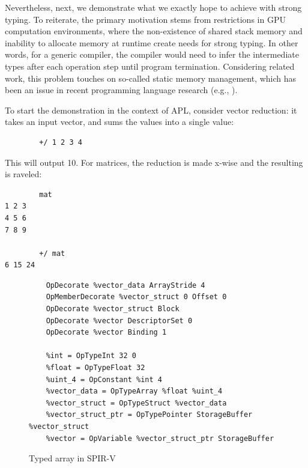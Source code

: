 \documentclass{report}
\begin{document}
Nevertheless, next, we demonstrate what we exactly hope to achieve with strong typing. To reiterate, the primary motivation stems from restrictions in GPU computation environments, where the non-existence of shared stack memory and inability to allocate memory at runtime create needs for strong typing. In other words, for a generic compiler, the compiler would need to infer the intermediate types after each operation step until program termination. Considering related work, this problem touches on so-called static memory management, which has been an issue in recent programming language research (e.g., \cite{proust2017asap}).

To start the demonstration in the context of APL, consider vector reduction: it takes an input vector, and sums the values into a single value:

\begin{verbatim}
        +/ 1 2 3 4
\end{verbatim}

This will output 10. For matrices, the reduction is made x-wise and the resulting is raveled:

\begin{verbatim}
        mat
1 2 3
4 5 6
7 8 9

        +/ mat
6 15 24
\end{verbatim}

\begin{figure}
    \begin{lstlisting}
    OpDecorate %vector_data ArrayStride 4
    OpMemberDecorate %vector_struct 0 Offset 0
    OpDecorate %vector_struct Block
    OpDecorate %vector DescriptorSet 0
    OpDecorate %vector Binding 1

    %int = OpTypeInt 32 0
    %float = OpTypeFloat 32
    %uint_4 = OpConstant %int 4
    %vector_data = OpTypeArray %float %uint_4
    %vector_struct = OpTypeStruct %vector_data
    %vector_struct_ptr = OpTypePointer StorageBuffer %vector_struct
    %vector = OpVariable %vector_struct_ptr StorageBuffer
    \end{lstlisting}
    \caption{Typed array in SPIR-V}
    \label{fig:typedspirv}
\end{figure}
\end{document}
